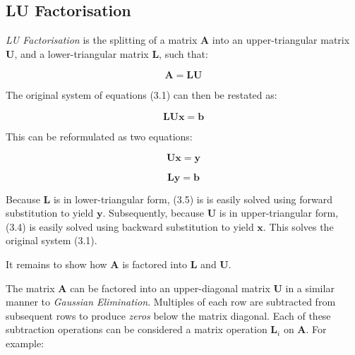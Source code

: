 %
%
\subsection{LU Factorisation}

\emph{LU Factorisation} is the splitting of a matrix $\mathbf{A}$ into an upper-triangular matrix $\mathbf{U}$, and a lower-triangular matrix $\mathbf{L}$, such that:

\begin{equation}
\mathbf{A}=\mathbf{L}\mathbf{U}
\end{equation}

The original system of equations (3.1) can then be restated as:

\begin{equation}
\mathbf{L}\mathbf{U}\mathbf{x}=\mathbf{b}
\end{equation}

This can be reformulated as two equations:

\begin{equation}
\mathbf{U}\mathbf{x}=\mathbf{y}
\end{equation}

\begin{equation}
\mathbf{L}\mathbf{y}=\mathbf{b}
\end{equation}

Because $\mathbf{L}$ is in lower-triangular form, (3.5) is is easily solved using forward substitution to yield $\mathbf{y}$. Subsequently, because $\mathbf{U}$ is in upper-triangular form, (3.4) is easily solved using backward substitution to yield $\mathbf{x}$. This solves the original system (3.1).

It remains to show how $\mathbf{A}$ is factored into $\mathbf{L}$ and $\mathbf{U}$.

The matrix $\mathbf{A}$ can be factored into an upper-diagonal matrix $\mathbf{U}$ in a similar manner to \emph{Gaussian Elimination}. Multiples of each row are subtracted from subsequent rows to produce \emph{zeros} below the matrix diagonal. Each of these subtraction operations can be considered a matrix operation $\mathbf{L}_i$ on $\mathbf{A}$. For example:

